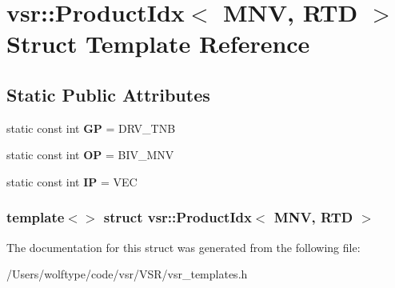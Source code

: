 \hypertarget{structvsr_1_1_product_idx_3_01_m_n_v_00_01_r_t_d_01_4}{\section{vsr\-:\-:Product\-Idx$<$ M\-N\-V, R\-T\-D $>$ Struct Template Reference}
\label{structvsr_1_1_product_idx_3_01_m_n_v_00_01_r_t_d_01_4}
}
\subsection*{Static Public Attributes}
\begin{DoxyCompactItemize}
\item 
\hypertarget{structvsr_1_1_product_idx_3_01_m_n_v_00_01_r_t_d_01_4_a5254d6b85d5778bf6a176e74599528b3}{static const int {\bfseries G\-P} = D\-R\-V\-\_\-\-T\-N\-B}\label{structvsr_1_1_product_idx_3_01_m_n_v_00_01_r_t_d_01_4_a5254d6b85d5778bf6a176e74599528b3}

\item 
\hypertarget{structvsr_1_1_product_idx_3_01_m_n_v_00_01_r_t_d_01_4_ac5325448e36b93e47e995cd97cf9677a}{static const int {\bfseries O\-P} = B\-I\-V\-\_\-\-M\-N\-V}\label{structvsr_1_1_product_idx_3_01_m_n_v_00_01_r_t_d_01_4_ac5325448e36b93e47e995cd97cf9677a}

\item 
\hypertarget{structvsr_1_1_product_idx_3_01_m_n_v_00_01_r_t_d_01_4_a7cbd4394429f19f747f662ff6a68d7d6}{static const int {\bfseries I\-P} = V\-E\-C}\label{structvsr_1_1_product_idx_3_01_m_n_v_00_01_r_t_d_01_4_a7cbd4394429f19f747f662ff6a68d7d6}

\end{DoxyCompactItemize}
\subsubsection*{template$<$$>$ struct vsr\-::\-Product\-Idx$<$ M\-N\-V, R\-T\-D $>$}



The documentation for this struct was generated from the following file\-:\begin{DoxyCompactItemize}
\item 
/\-Users/wolftype/code/vsr/\-V\-S\-R/vsr\-\_\-templates.\-h\end{DoxyCompactItemize}
